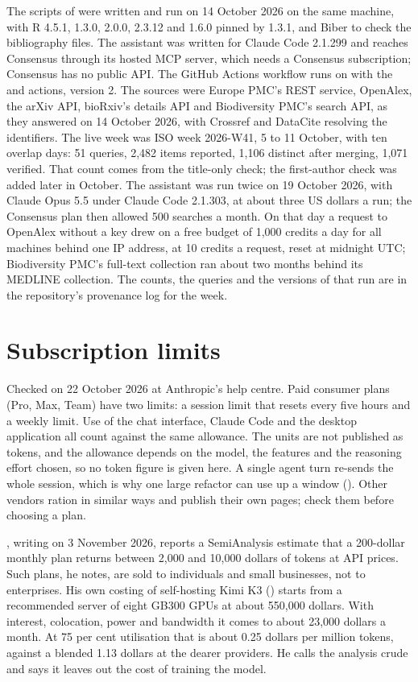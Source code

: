 The scripts of  were written and run on
14 October 2026 on the same machine, with R 4.5.1,  1.3.0,
 2.0.0,  2.3.12 and  1.6.0 pinned by
 1.3.1, and Biber to check the bibliography files. The assistant
was written for Claude Code 2.1.299 and reaches Consensus through its hosted
MCP server, which needs a Consensus subscription; Consensus has no public
API. The GitHub Actions workflow runs on  with the
  and  actions, version 2.
The sources were Europe PMC's REST service, OpenAlex, the arXiv API,
bioRxiv's details API and Biodiversity PMC's search API, as they answered on
14 October 2026, with Crossref and DataCite resolving the identifiers. The
live week was ISO week 2026-W41, 5 to 11 October, with ten overlap days: 51
queries, 2,482 items reported, 1,106 distinct after merging, 1,071 verified.
That count comes from the title-only check; the first-author check was added
later in October. The assistant was run twice on 19 October 2026, with
Claude Opus 5.5 under Claude Code 2.1.303, at about three US dollars a run;
the Consensus plan then allowed 500 searches a month.
On that day a request to OpenAlex without a key drew on a free budget of
1,000 credits a day for all machines behind one IP address, at 10 credits a
request, reset at midnight UTC; Biodiversity PMC's full-text collection
ran about two months behind its MEDLINE collection. The counts, the queries
and the versions of that run are in the repository's provenance log for the
week.

\section{Subscription limits}

Checked on 22 October 2026 at Anthropic's help centre. Paid consumer plans
(Pro, Max, Team) have two limits: a session limit that resets every five
hours and a weekly limit. Use of the chat interface, Claude Code and the
desktop application all count against the same allowance. The units are not
published as tokens, and the allowance depends on the model, the features and
the reasoning effort chosen, so no token figure is given here. A single agent
turn re-sends the whole session, which is why one large refactor can use up a
window (). Other vendors ration in similar ways and publish
their own pages; check them before choosing a plan.

\textcite{wickham2026tokencost}, writing on 3 November 2026, reports a
SemiAnalysis estimate that a 200-dollar monthly plan returns between 2,000 and
10,000 dollars of tokens at API prices. Such plans, he notes, are sold to
individuals and small businesses, not to enterprises. His own costing of
self-hosting Kimi K3 () starts from a recommended server
of eight GB300 GPUs at about 550,000 dollars. With interest, colocation, power
and bandwidth it comes to about 23,000 dollars a month. At 75 per cent
utilisation that is about 0.25 dollars per million tokens, against a blended
1.13 dollars at the dearer providers. He calls the analysis crude and says it
leaves out the cost of training the model.

